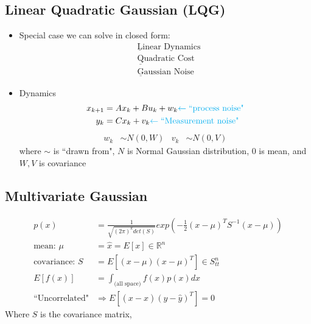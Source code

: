 \documentclass[11pt]{article}
\begin{document}
\subsection*{Linear Quadratic Gaussian (LQG)}
\begin{itemize}
    \item Special case we can solve in closed form:
    \begin{align*}
        &\underline{\text{L}}\text{inear Dynamics}
        \\
        &\underline{\text{Q}}\text{uadratic Cost} 
        \\
        &\underline{\text{G}}\text{aussian Noise}
    \end{align*}
    \item Dynamics
    \begin{align*}
        x_{k+1} &= Ax_k + Bu_k + w_k\textcolor{cyan}{\leftarrow\text{``process noise"}} \\
        y_k &= Cx_k + v_k\textcolor{cyan}{\leftarrow\text{``Measurement noise"}}
    \end{align*}
    \begin{align*}
        w_k &\sim N(0,W) & v_k&\sim N(0,V)
    \end{align*}
    where $\sim$ is ``drawn from", $N$ is Normal Gaussian distribution, 0 is mean, and $W,V$
 is covariance
 \end{itemize}

 \subsection*{Multivariate Gaussian}
 \begin{align*}
     p(x) &= \frac{1}{\sqrt{(2\pi)^k det(S)}}exp(-\frac{1}{2}(x-\mu)^TS^{-1}(x-\mu))
     \\
     \text{mean: } \mu &= \hat{x} = E[x] \in \mathbb{R}^n  
     \\
     \text{covariance: } S &= E[(x-\mu)(x-\mu)^T] \in S_{tt}^n
     \\
     E[f(x)] &= \int_\text{(all space)}f(x) p(x) dx
     \\
     \text{``Uncorrelated"} &\Rightarrow E[(x-\hat{x})(y-\hat{y})^T] = 0
 \end{align*}
 Where $S$ is the covariance matrix, 
\end{document}

